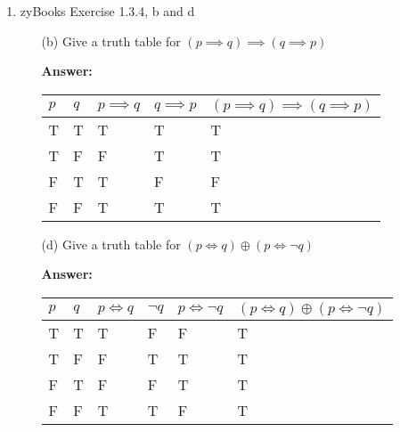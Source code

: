 \documentclass[12pt]{extreport}
\newcommand{\answer}[0]{\medskip \textbf{Answer:} \medskip}
\newcommand{\xor}[0]{\oplus}
\begin{document}
\begin{enumerate}
\begin{enumerate}
        \end{enumerate}

    \item zyBooks Exercise 1.3.4, b and d
    
        \begin{enumerate}
            
            \item[(b)] Give a truth table for \( (p \implies q) \implies (q \implies p) \)

                \answer

                \begin{tabular}{|l|l|l|l|l|}
                    \hline
                    \( p \) & \( q \) & \( p \implies q \) & \(q \implies p \) & \( (p \implies q) \implies (q \implies p) \) \\ 
                    \hline
                    T & T & T & T & T \\ \hline
                    T & F & F & T & T \\ \hline
                    F & T & T & F & F \\ \hline
                    F & F & T & T & T \\ \hline
                \end{tabular}
            
                \item[(d)] Give a truth table for \( (p \iff q) \xor (p \iff \neg q) \)
                
                    \answer

                    \begin{tabular}{|l|l|l|l|l|l|}
                        \hline
                        \( p \) & \( q \) & \( p \iff q \) & \( \neg q \) & \( p \iff \neg q \) & \( (p \iff q) \xor (p \iff \neg q) \) \\ \hline
                        T & T & T & F & F & T \\ \hline
                        T & F & F & T & T & T \\ \hline
                        F & T & F & F & T & T \\ \hline
                        F & F & T & T & F & T \\ \hline
                    \end{tabular}

        \end{enumerate}

\end{enumerate}
\newpage
\end{document}
